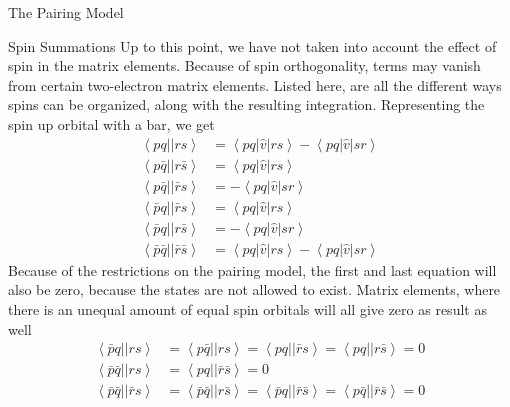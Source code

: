 \documentclass[twoside,english]{uiofysmaster}
\begin{document}
\begin{chapter}{The Pairing Model}
 	\begin{section}{Spin Summations}
 		Up to this point, we have not taken into account the effect of spin in the matrix elements. Because of spin orthogonality, terms may vanish from certain two-electron matrix elements. Listed here, are all the different ways spins can be organized, along with the resulting integration. Representing the spin up orbital with a bar, we get \cite{ShavittAndBartlett}
 		\begin{align}
 			\left< pq || rs \right> &= \left< pq | \hat v | rs \right> - \left< pq | \hat v | sr \right> \\
 			\left< p\bar q || r\bar s \right> &= \left<pq | \hat v | rs \right> \\
 			\left< p \bar q|| \bar r s \right> &= - \left<pq | \hat v | sr \right> \\
 			\left< \bar p q|| \bar r s\right> &= \left< pq | \hat v | rs \right> \\
 			\left< \bar p q|| r \bar s \right> &= - \left< pq | \hat v | sr \right> \\
 			\left< \bar p \bar q || \bar r \bar s \right> &= \left< pq | \hat v | rs \right> - \left< pq | \hat v | sr \right> 
 		\end{align}
 		Because of the restrictions on the pairing model, the first and last equation will also be zero, because the states are not allowed to exist. Matrix elements, where there is an unequal amount of equal spin orbitals will all give zero as result as well
 		\begin{align}
 			\left< \bar p q || rs \right> &= \left< p \bar q || rs \right> = \left< pq || \bar r s \right> = \left< pq || r \bar s \right> = 0 \\
 			\left< \bar p \bar q || rs \right> &= \left< pq || \bar r \bar s \right>  = 0 \\
 			\left< \bar p \bar q || \bar r s \right> &= \left< \bar p \bar q || r \bar s \right> = \left< \bar p q || \bar r \bar s \right> = \left< p \bar q || \bar r \bar s \right> = 0
 		\end{align} 


 	\end{section}

\end{chapter}
\end{document}
